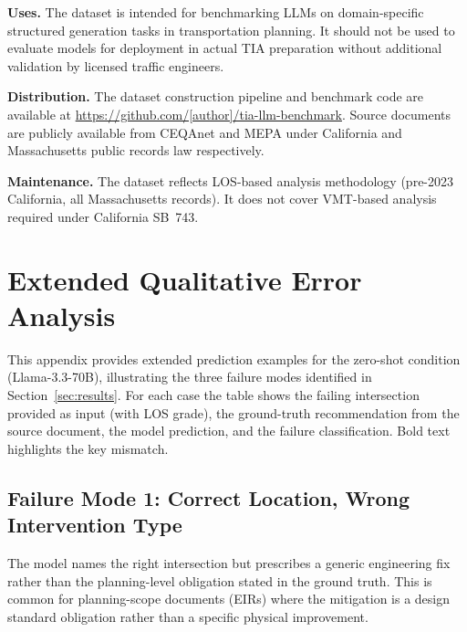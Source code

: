 \documentclass[preprint,12pt]{elsarticle}
\begin{document}
\textbf{Uses.}
The dataset is intended for benchmarking LLMs on domain-specific structured
generation tasks in transportation planning.
It should not be used to evaluate models for deployment in actual TIA
preparation without additional validation by licensed traffic engineers.

\textbf{Distribution.}
The dataset construction pipeline and benchmark code are available at
\url{https://github.com/[author]/tia-llm-benchmark}.
Source documents are publicly available from CEQAnet and MEPA under
California and Massachusetts public records law respectively.

\textbf{Maintenance.}
The dataset reflects LOS-based analysis methodology (pre-2023 California,
all Massachusetts records).
It does not cover VMT-based analysis required under California SB~743.


\section{Extended Qualitative Error Analysis}
\label{app:qualitative}

This appendix provides extended prediction examples for the zero-shot condition
(Llama-3.3-70B), illustrating the three failure modes identified in
Section~\ref{sec:results}.
For each case the table shows the failing intersection provided as input
(with LOS grade), the ground-truth recommendation from the source document,
the model prediction, and the failure classification.
Bold text highlights the key mismatch.

\subsection*{Failure Mode 1: Correct Location, Wrong Intervention Type}

The model names the right intersection but prescribes a generic engineering
fix rather than the planning-level obligation stated in the ground truth.
This is common for planning-scope documents (EIRs) where the mitigation
is a design standard obligation rather than a specific physical improvement.
\end{document}
